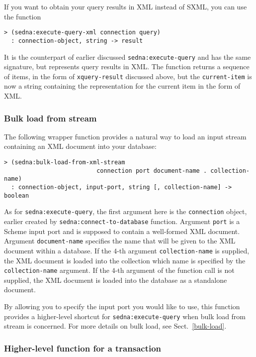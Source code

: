 \documentclass[a4paper,12pt]{article}
\begin{document}
If you want to obtain your query results in XML instead of SXML, you can use
the function
\begin{verbatim}> (sedna:execute-query-xml connection query)
  : connection-object, string -> result\end{verbatim}
It is the counterpart of earlier discussed \texttt{sedna:execute-query} and
has the same signature, but represents query results in XML.
The function returns a sequence of items, in the form of \texttt{xquery-result}
discussed above, but the \texttt{current-item} is now a string containing the
representation for the current item in the form of XML.


\subsubsection{Bulk load from stream}

The following wrapper function provides a natural way to load an input stream
containing an XML document into your database:
\begin{verbatim}> (sedna:bulk-load-from-xml-stream
                          connection port document-name . collection-name)
  : connection-object, input-port, string [, collection-name] -> boolean\end{verbatim}

As for \texttt{sedna:execute-query}, the first argument here is the
\texttt{connection} object, earlier created by
\texttt{sedna:connect-to-database} function.
Argument \texttt{port} is a Scheme input port and is supposed to contain
a well-formed XML document.
Argument \texttt{document-name} specifies the name that will be given to the
XML document within a database.
If the $4$-th argument \texttt{collection-name} is supplied, the XML document
is loaded into the collection which name is specified by the
\texttt{collection-name} argument.
If the $4$-th argument of the function call is not supplied, the XML document
is loaded into the database as a standalone document.

By allowing you to specify the input port you would like to use, this function
provides a higher-level shortcut for \texttt{sedna:execute-query} when bulk
load from stream is concerned.
For more details on bulk load, see Sect.~\ref{bulk-load}.

\subsubsection{Higher-level function for a transaction}
\end{document}
